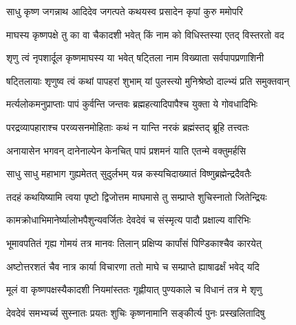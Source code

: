 \label{sec:padma-magha-krishna-shattila}

\ganapatyadiDhyanam
\padmaPuranam



\twolineshloka
{साधु कृष्ण जगन्नाथ आदिदेव जगत्पते}
{कथयस्व प्रसादेन कृपां कुरु ममोपरि}%

\twolineshloka
{माघस्य कृष्णपक्षे तु का वा चैकादशी भवेत्}
{किं नाम को विधिस्तस्या एतद् विस्तरतो वद}%


\twolineshloka
{शृणु त्वं नृपशार्दूल कृष्णमाघस्य या भवेत्}
{षट्तिला नाम विख्याता सर्वपापप्रणाशिनी}%

\twolineshloka
{षट्तिलायाः शृणुष्व त्वं कथां पापहरां शुभाम्}
{यां पुलस्त्यो मुनिश्रेष्ठो दाल्भ्यं प्रति समुक्तवान्}%


\twolineshloka
{मर्त्यलोकमनुप्राप्ताः पापं कुर्वन्ति जन्तवः}
{ब्रह्महत्यादिपापैश्च युक्ता ये गोवधादिभिः}%

\twolineshloka
{परद्रव्यापहाराश्च परव्यसनमोहिताः}
{कथं न यान्ति नरकं ब्रह्मंस्तद् ब्रूहि तत्त्वतः}%

\twolineshloka
{अनायासेन भगवन् दानेनाल्पेन केनचित्}
{पापं प्रशमनं याति एतन्मे वक्तुमर्हसि}%


\twolineshloka
{साधु साधु महाभाग गुह्यमेतत् सुदुर्लभम्}
{यन्न कस्यचिदाख्यातं विष्णुब्रह्मेन्द्रदैवतैः}%

\twolineshloka
{तदहं कथयिष्यामि त्वया पृष्टो द्विजोत्तम}
{माघमासे तु सम्प्राप्ते शुचिस्नातो जितेन्द्रियः}%

\twolineshloka
{कामक्रोधाभिमानेर्ष्यालोभपैशुन्यवर्जितः}
{देवदेवं च संस्मृत्य पादौ प्रक्षाल्य वारिभिः}%

\twolineshloka
{भूमावपतितं गृह्य गोमयं तत्र मानवः}
{तिलान् प्रक्षिप्य कार्पांसं पिण्डिकाश्चैव कारयेत्}%

\twolineshloka
{अष्टोत्तरशतं चैव नात्र कार्या विचारणा}
{ततो माघे च सम्प्राप्ते ह्याषाढर्क्षं भवेद् यदि}%

\twolineshloka
{मूलं वा कृष्णपक्षस्यैकादशी नियमांस्ततः}
{गृह्णीयात् पुण्यकाले च विधानं तत्र मे शृणु}%

\twolineshloka
{देवदेवं समभ्यर्च्य सुस्नातः प्रयतः शुचिः}
{कृष्णनामानि सङ्कीर्त्य पुनः प्रस्खलितादिषु}%

